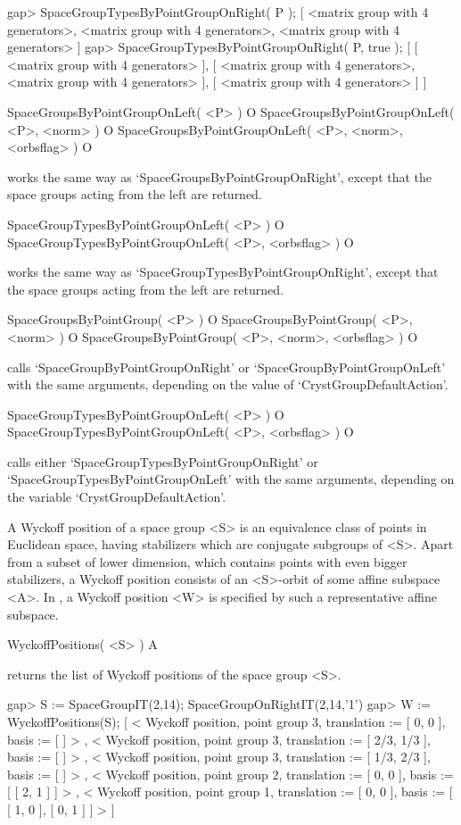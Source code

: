 \beginexample
gap> SpaceGroupTypesByPointGroupOnRight( P );
[ <matrix group with 4 generators>, <matrix group with 4 generators>, 
  <matrix group with 4 generators> ]
gap> SpaceGroupTypesByPointGroupOnRight( P, true );
[ [ <matrix group with 4 generators> ], 
  [ <matrix group with 4 generators>, <matrix group with 4 generators> ], 
  [ <matrix group with 4 generators> ] ]
\endexample

\>SpaceGroupsByPointGroupOnLeft( <P> ) O
\>SpaceGroupsByPointGroupOnLeft( <P>, <norm> ) O
\>SpaceGroupsByPointGroupOnLeft( <P>, <norm>, <orbsflag> ) O

works the same way as `SpaceGroupsByPointGroupOnRight', except that
the space groups acting from the left are returned.

\>SpaceGroupTypesByPointGroupOnLeft( <P> ) O
\>SpaceGroupTypesByPointGroupOnLeft( <P>, <orbsflag> ) O

works the same way as `SpaceGroupTypesByPointGroupOnRight', except that
the space groups acting from the left are returned.

\>SpaceGroupsByPointGroup( <P> ) O
\>SpaceGroupsByPointGroup( <P>, <norm> ) O
\>SpaceGroupsByPointGroup( <P>, <norm>, <orbsflag> ) O

calls `SpaceGroupByPointGroupOnRight' or `SpaceGroupByPointGroupOnLeft' 
with the same arguments, depending on the value of `CrystGroupDefaultAction'.

\>SpaceGroupTypesByPointGroupOnLeft( <P> ) O
\>SpaceGroupTypesByPointGroupOnLeft( <P>, <orbsflag> ) O

calls either `SpaceGroupTypesByPointGroupOnRight' or
`SpaceGroupTypesByPointGroupOnLeft' with the same arguments, depending
on the variable `CrystGroupDefaultAction'.


A Wyckoff position of a space group <S> is an equivalence class of
points in Euclidean space, having stabilizers which are conjugate
subgroups of <S>.  Apart from a subset of lower dimension, which
contains points with even bigger stabilizers, a Wyckoff position
consists of an <S>-orbit of some affine subspace <A>. In {\Cryst},
a Wyckoff position <W> is specified by such a representative affine
subspace.

\>WyckoffPositions( <S> ) A

returns the list of Wyckoff positions of the space group <S>.

\beginexample
gap> S := SpaceGroupIT(2,14);
SpaceGroupOnRightIT(2,14,'1')
gap> W := WyckoffPositions(S);
[ < Wyckoff position, point group 3, translation := [ 0, 0 ], 
    basis := [  ] >
    , < Wyckoff position, point group 3, translation := [ 2/3, 1/3 ], 
    basis := [  ] >
    , < Wyckoff position, point group 3, translation := [ 1/3, 2/3 ], 
    basis := [  ] >
    , < Wyckoff position, point group 2, translation := [ 0, 0 ], 
    basis := [ [ 2, 1 ] ] >
    , < Wyckoff position, point group 1, translation := [ 0, 0 ], 
    basis := [ [ 1, 0 ], [ 0, 1 ] ] >
     ]
\endexample

